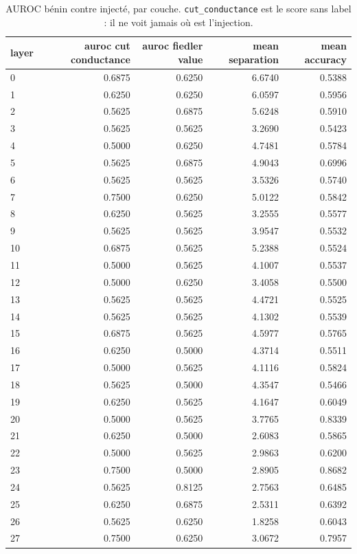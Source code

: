 \documentclass[11pt,a4paper]{article}
\begin{document}
\begin{table}[htbp]
\centering
\small
\begin{tabular}{lrrrr}
\hline
layer & auroc cut conductance & auroc fiedler value & mean separation & mean accuracy \\
\hline
0 & 0.6875 & 0.6250 & 6.6740 & 0.5388 \\
1 & 0.6250 & 0.6250 & 6.0597 & 0.5956 \\
2 & 0.5625 & 0.6875 & 5.6248 & 0.5910 \\
3 & 0.5625 & 0.5625 & 3.2690 & 0.5423 \\
4 & 0.5000 & 0.6250 & 4.7481 & 0.5784 \\
5 & 0.5625 & 0.6875 & 4.9043 & 0.6996 \\
6 & 0.5625 & 0.5625 & 3.5326 & 0.5740 \\
7 & 0.7500 & 0.6250 & 5.0122 & 0.5842 \\
8 & 0.6250 & 0.5625 & 3.2555 & 0.5577 \\
9 & 0.5625 & 0.5625 & 3.9547 & 0.5532 \\
10 & 0.6875 & 0.5625 & 5.2388 & 0.5524 \\
11 & 0.5000 & 0.5625 & 4.1007 & 0.5537 \\
12 & 0.5000 & 0.6250 & 3.4058 & 0.5500 \\
13 & 0.5625 & 0.5625 & 4.4721 & 0.5525 \\
14 & 0.5625 & 0.5625 & 4.1302 & 0.5539 \\
15 & 0.6875 & 0.5625 & 4.5977 & 0.5765 \\
16 & 0.6250 & 0.5000 & 4.3714 & 0.5511 \\
17 & 0.5000 & 0.5625 & 4.1116 & 0.5824 \\
18 & 0.5625 & 0.5000 & 4.3547 & 0.5466 \\
19 & 0.6250 & 0.5625 & 4.1647 & 0.6049 \\
20 & 0.5000 & 0.5625 & 3.7765 & 0.8339 \\
21 & 0.6250 & 0.5000 & 2.6083 & 0.5865 \\
22 & 0.5000 & 0.5625 & 2.9863 & 0.6200 \\
23 & 0.7500 & 0.5000 & 2.8905 & 0.8682 \\
24 & 0.5625 & 0.8125 & 2.7563 & 0.6485 \\
25 & 0.6250 & 0.6875 & 2.5311 & 0.6392 \\
26 & 0.5625 & 0.6250 & 1.8258 & 0.6043 \\
27 & 0.7500 & 0.6250 & 3.0672 & 0.7957 \\
\hline
\end{tabular}
\caption{AUROC bénin contre injecté, par couche. \texttt{cut\_conductance} est le score sans label : il ne voit jamais où est l'injection.}
\label{tab:layers}
\end{table}
\end{document}
